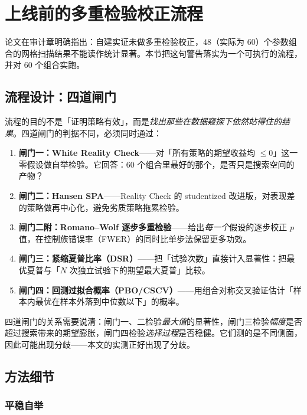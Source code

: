 \section{上线前的多重检验校正流程}\label{sec:mtflow}

论文在审计章明确指出：自建实证未做多重检验校正，$48$（实际为 $60$）个参数组合的网格扫描结果不能读作统计显著。本节把这句警告落实为一个可执行的流程，并对 $60$ 个组合实跑。

\subsection{流程设计：四道闸门}

流程的目的不是「证明策略有效」，而是\emph{找出那些在数据窥探下依然站得住的结果}。四道闸门的判据不同，必须同时通过：

\begin{enumerate}[leftmargin=2.2em]
  \item \textbf{闸门一：White Reality Check}——对「所有策略的期望收益均 $\le0$」这一零假设做自举检验\cite{white2000}。它回答：$60$ 个组合里最好的那个，是否只是搜索空间的产物？
  \item \textbf{闸门二：Hansen SPA}——Reality Check 的 studentized 改进版，对表现差的策略做再中心化，避免劣质策略拖累检验\cite{hansen2005}。
  \item \textbf{闸门二附：Romano--Wolf 逐步多重检验}——给出\emph{每一个}假设的逐步校正 $p$ 值，在控制族错误率（FWER）的同时比单步法保留更多功效\cite{romanowolf2005}。
  \item \textbf{闸门三：紧缩夏普比率（DSR）}——把「试验次数」直接计入显著性：把最优夏普与「$N$ 次独立试验下的期望最大夏普」比较\cite{bailey2014}。
  \item \textbf{闸门四：回测过拟合概率（PBO/CSCV）}——用组合对称交叉验证估计「样本内最优在样本外落到中位数以下」的概率\cite{bailey2016}。
\end{enumerate}

四道闸门的关系需要说清：闸门一、二检验\emph{最大值}的显著性，闸门三检验\emph{幅度}是否超过搜索带来的期望膨胀，闸门四检验\emph{选择过程}是否稳健。它们测的是不同侧面，因此可能出现分歧——本文的实测正好出现了分歧。

\subsection{方法细节}

\subsubsection*{平稳自举}

